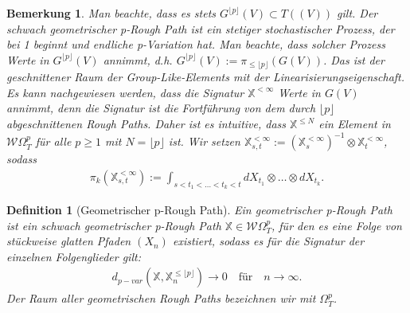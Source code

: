 \documentclass[12pt,titlepage,headsepline]{article}
\newtheorem{definition}{Definition}[section]
\newtheorem*{bemerkung*}{Bemerkung}
\begin{document}
      \begin{bemerkung*}
        \textup{
        Man beachte, dass es stets $ G^{\lfloor p\rfloor}(V) \subset T((V))$ gilt. Der schwach geometrischer p-Rough Path ist ein stetiger stochastischer Prozess, der bei 1 beginnt und endliche p-Variation hat. Man beachte, dass solcher Prozess Werte in $G^{\lfloor p\rfloor}(V)$ annimmt, d.h. $G^{\lfloor p\rfloor}(V):=\pi_{\leq {\lfloor p\rfloor}}(G(V))$. Das ist der geschnittener Raum der Group-Like-Elements mit der Linearisierungseigenschaft. Es kann nachgewiesen werden, dass die Signatur $\mathbb{X}^{<\infty}$ Werte in $G(V)$ annimmt, denn die Signatur ist die Fortführung von dem durch $\lfloor p\rfloor$ abgeschnittenen Rough Paths. Daher ist es intuitive, dass $\mathbb{X}^{\leq N}$ ein Element in
        $\mathcal{W}\Omega^p_T$ für alle $p \geq 1$ mit $N=\lfloor p \rfloor$ ist.
        Wir setzen $\mathbb{X}^{<\infty}_{s,t}:=(\mathbb{X}^{<\infty}_s)^{-1}\otimes \mathbb{X}^{<\infty}_t$,
        sodass
        \begin{align*}
          \pi_k(\mathbb{X}^{<\infty}_{s,t}):=\int_{s<t_1<\ldots<t_k<t} dX_{t_1}\otimes \ldots \otimes dX_{t_k}.
        \end{align*}
        }
      \end{bemerkung*}
      \begin{definition}[Geometrischer p-Rough Path]
        Ein geometrischer p-Rough Path ist ein schwach geometrischer p-Rough Path $\mathbb{X} \in \mathcal{W}\Omega^p_T$, für den es eine Folge von stückweise glatten Pfaden $(X_n)$ existiert, sodass es für die Signatur der einzelnen Folgenglieder gilt:
        \begin{align*}
          d_{p-var}(\mathbb{X},\mathbb{X}^{\leq \lfloor p \rfloor}_n) \rightarrow 0 \quad \text{für} \quad n \rightarrow \infty.
        \end{align*}
        Der Raum aller geometrischen Rough Paths bezeichnen wir mit $\Omega^p_T$.
      \end{definition}
\end{document}
